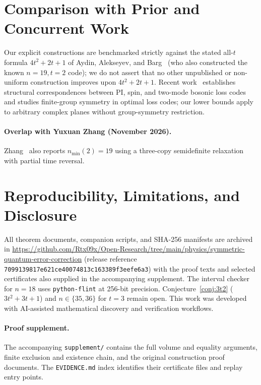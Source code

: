 \documentclass[11pt,letterpaper]{article}
\theoremstyle{definition}
\theoremstyle{remark}
\begin{document}
\section{Comparison with Prior and Concurrent Work}
Our explicit constructions are benchmarked strictly against the stated all-$t$ formula $4t^2+2t+1$ of Aydin, Alekseyev, and Barg~\cite{AAB2024} (who also constructed the known $n=19, t=2$ code); we do not assert that no other unpublished or non-uniform construction improves upon $4t^2+2t+1$. Recent work~\cite{SpinBosonicPI2026,TwoModeLoss2026} establishes structural correspondences between PI, spin, and two-mode bosonic loss codes and studies finite-group symmetry in optimal loss codes; our lower bounds apply to arbitrary complex planes without group-symmetry restriction.

\paragraph{Overlap with Yuxuan Zhang (November 2026).}
Zhang~\cite{Zhang2026} also reports $n_{\min}(2)=19$ using a three-copy semidefinite relaxation with partial time reversal.

\section{Reproducibility, Limitations, and Disclosure}
All theorem documents, companion scripts, and SHA-256 manifests are archived in \url{https://github.com/Rtx09x/Open-Research/tree/main/physics/symmetric-quantum-error-correction} (release reference \texttt{7099139817e621ce40074813c163389f3eefe6a3}) with the proof texts and selected certificates also supplied in the accompanying supplement. The interval checker for $n=18$ uses \texttt{python-flint} at 256-bit precision. Conjecture~\ref{conj:3t2} ($3t^2+3t+1$) and $n \in \{35,36\}$ for $t=3$ remain open. This work was developed with AI-assisted mathematical discovery and verification workflows.

\paragraph{Proof supplement.}
The accompanying \texttt{supplement/} contains the full volume and equality arguments, finite exclusion and existence chain, and the original construction proof documents. The \texttt{EVIDENCE.md} index identifies their certificate files and replay entry points.


\end{document}
